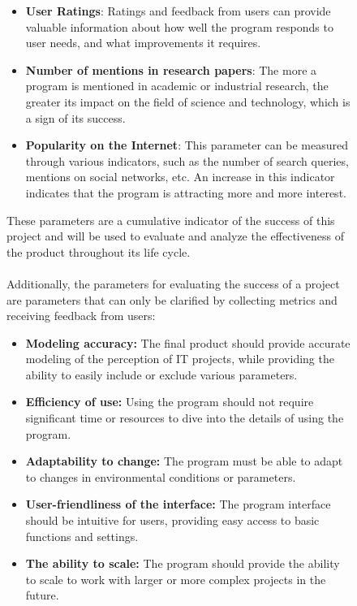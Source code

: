 \documentclass{article}
\begin{document}
\begin{figure}[!t]
\begin{minipage}{0.49\textwidth}
\begin{itemize}
                \item \textbf{User Ratings}: Ratings and feedback from users can provide valuable information about how well the program responds to user needs, and what improvements it requires.
                \item \textbf{Number of mentions in research papers}: The more a program is mentioned in academic or industrial research, the greater its impact on the field of science and technology, which is a sign of its success.
                \item \textbf{Popularity on the Internet}: This parameter can be measured through various indicators, such as the number of search queries, mentions on social networks, etc. An increase in this indicator indicates that the program is attracting more and more interest.
            \end{itemize}
            These parameters are a cumulative indicator of the success of this project and will be used to evaluate and analyze the effectiveness of the product throughout its life cycle.\\
            ~\\
            Additionally, the parameters for evaluating the success of a project are parameters that can only be clarified by collecting metrics and receiving feedback from users:
            \begin{itemize}
                \item \textbf{Modeling accuracy:} The final product should provide accurate modeling of the perception of IT projects, while providing the ability to easily include or exclude various parameters.
                \item \textbf{Efficiency of use:} Using the program should not require significant time or resources to dive into the details of using the program.
                \item \textbf{Adaptability to change:} The program must be able to adapt to changes in environmental conditions or parameters.
                \item \textbf{User-friendliness of the interface:} The program interface should be intuitive for users, providing easy access to basic functions and settings.
                \item \textbf{The ability to scale:} The program should provide the ability to scale to work with larger or more complex projects in the future.
            \end{itemize}
            ~\\

\end{minipage}
\end{figure}
\end{document}
